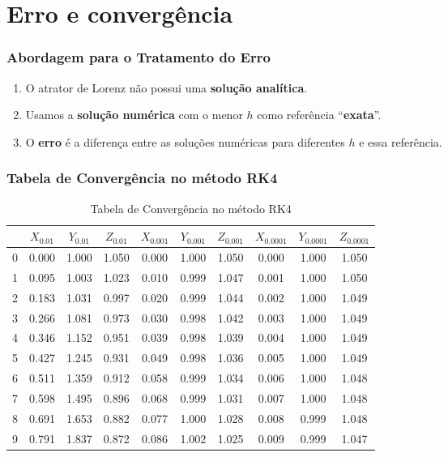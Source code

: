 \section{Erro e convergência}

\begin{frame}
    \frametitle{Abordagem para o Tratamento do Erro}
    \begin{enumerate}
        \item O atrator de Lorenz não possui uma \textbf{solução analítica}.
        \item Usamos a \textbf{solução numérica} com o menor $h$ como referência ``\textbf{exata}''.
        \item O \textbf{erro} é a diferença entre as soluções numéricas para diferentes $h$ e essa referência.
    \end{enumerate}
\end{frame}



\begin{frame}
    \frametitle{Tabela de Convergência no método RK4}
    \scriptsize
    \begin{table}[H]
    \centering
    \begin{tabular}{c c c c c c c c c c}
    \toprule
     & $X_{0.01}$ & $Y_{0.01}$ & $Z_{0.01}$ & $X_{0.001}$ & $Y_{0.001}$ & $Z_{0.001}$ & $X_{0.0001}$ & $Y_{0.0001}$ & $Z_{0.0001}$ \\
    \midrule
    0  & 0.000 & 1.000 & 1.050 & 0.000 & 1.000 & 1.050 & 0.000 & 1.000 & 1.050 \\
    1  & 0.095 & 1.003 & 1.023 & 0.010 & 0.999 & 1.047 & 0.001 & 1.000 & 1.050 \\
    2  & 0.183 & 1.031 & 0.997 & 0.020 & 0.999 & 1.044 & 0.002 & 1.000 & 1.049 \\
    3  & 0.266 & 1.081 & 0.973 & 0.030 & 0.998 & 1.042 & 0.003 & 1.000 & 1.049 \\
    4  & 0.346 & 1.152 & 0.951 & 0.039 & 0.998 & 1.039 & 0.004 & 1.000 & 1.049 \\
    5  & 0.427 & 1.245 & 0.931 & 0.049 & 0.998 & 1.036 & 0.005 & 1.000 & 1.049 \\
    6  & 0.511 & 1.359 & 0.912 & 0.058 & 0.999 & 1.034 & 0.006 & 1.000 & 1.048 \\
    7  & 0.598 & 1.495 & 0.896 & 0.068 & 0.999 & 1.031 & 0.007 & 1.000 & 1.048 \\
    8  & 0.691 & 1.653 & 0.882 & 0.077 & 1.000 & 1.028 & 0.008 & 0.999 & 1.048 \\
    9  & 0.791 & 1.837 & 0.872 & 0.086 & 1.002 & 1.025 & 0.009 & 0.999 & 1.047 \\
    \bottomrule
    \end{tabular}
    \caption{Tabela de Convergência no método RK4}
    \end{table}
\end{frame}

